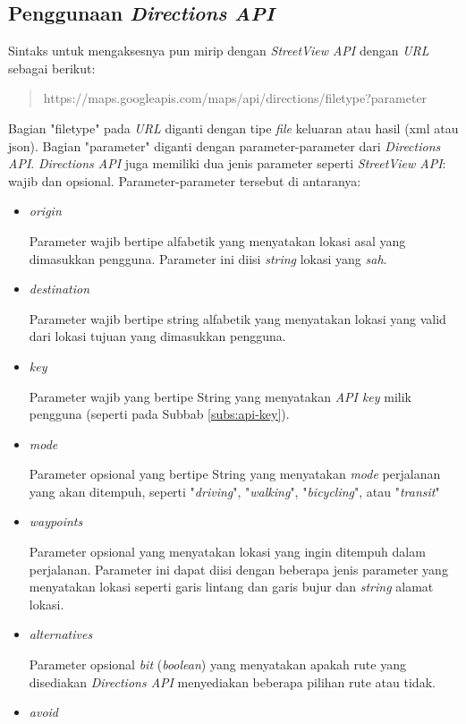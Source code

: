 \subsection{Penggunaan {\it Directions API}}
Sintaks untuk mengaksesnya pun mirip dengan \textit{StreetView API} dengan \textit{URL} sebagai berikut:
\begin{quote}
https://maps.googleapis.com/maps/api/directions/filetype?parameter
\end{quote}
Bagian "filetype" pada \textit{URL} diganti dengan tipe \textit{file} keluaran atau hasil (xml atau json). Bagian "parameter" diganti dengan parameter-parameter dari {\it Directions API}.  {\it Directions API} juga memiliki dua jenis parameter seperti {\it StreetView API}: wajib dan opsional. Parameter-parameter tersebut di antaranya:

\begin{itemize}
	\item \textit{origin}
	
	Parameter wajib bertipe alfabetik yang menyatakan lokasi asal yang dimasukkan pengguna. Parameter ini diisi \textit{string} lokasi yang \textit{sah}.
	\item \textit{destination}
	
	Parameter wajib bertipe string alfabetik yang menyatakan lokasi yang valid dari lokasi tujuan yang dimasukkan pengguna.
	\item \textit{key}
	
	Parameter wajib yang bertipe String yang menyatakan \textit{API key} milik pengguna (seperti pada Subbab \ref{subs:api-key}).
	\item \textit{mode}
	
	Parameter opsional yang bertipe String yang menyatakan \textit{mode} perjalanan yang akan ditempuh, seperti "\textit{driving}", "\textit{walking}", "\textit{bicycling}", atau "\textit{transit}"
	\item \textit{waypoints}
	
	Parameter opsional yang menyatakan lokasi yang ingin ditempuh dalam perjalanan. Parameter ini dapat diisi dengan beberapa jenis parameter yang menyatakan lokasi seperti garis lintang dan garis bujur dan \textit{string} alamat lokasi.
	\item \textit{alternatives}
	
	Parameter opsional \textit{bit} (\textit{boolean}) yang menyatakan apakah rute yang disediakan \textit{Directions API} menyediakan beberapa pilihan rute atau tidak. 
	\item \textit{avoid}
	

\end{itemize}
